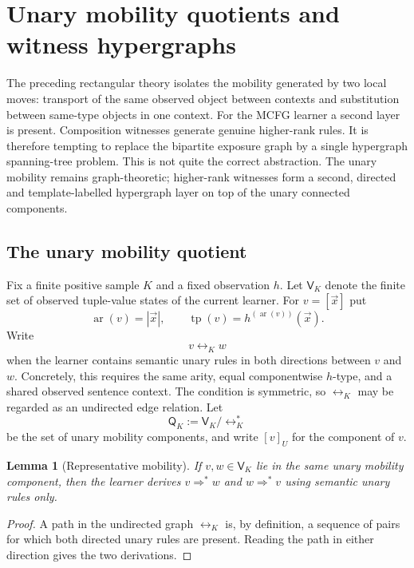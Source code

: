 \documentclass[11pt]{article}
\newtheorem{lemma}[definition]{Lemma}
\begin{document}
\section{Unary mobility quotients and witness hypergraphs}
\label{sec:witness-hypergraph}

The preceding rectangular theory isolates the mobility generated by two local
moves: transport of the same observed object between contexts and substitution
between same-type objects in one context.  For the MCFG learner a second layer
is present.  Composition witnesses generate genuine
higher-rank rules.  It is therefore tempting to replace the bipartite exposure
graph by a single hypergraph spanning-tree problem.  This is not quite the
correct abstraction.  The unary mobility remains graph-theoretic; higher-rank
witnesses form a second, directed and template-labelled hypergraph layer on top
of the unary connected components.

\subsection{The unary mobility quotient}

Fix a finite positive sample $K$ and a fixed observation $h$.  Let
$\mathsf V_K$ denote the finite set of observed tuple-value states of the
current learner.  For $v=[\vec x]$ put
\[
  \operatorname{ar}(v)=|\vec x|,
  \qquad
  \operatorname{tp}(v)=h^{(\operatorname{ar}(v))}(\vec x).
\]
Write
\[
  v\leftrightarrow_K w
\]
when the learner contains semantic unary rules in both directions between
$v$ and $w$.  Concretely, this requires the same arity, equal componentwise $h$-type,
and a shared observed sentence context.  The
condition is symmetric, so $\leftrightarrow_K$ may be regarded as an undirected
edge relation.  Let
\[
  \mathsf Q_K:=\mathsf V_K/{\leftrightarrow_K^*}
\]
be the set of unary mobility components, and write $[v]_U$ for the component
of $v$.

\begin{lemma}[Representative mobility]
\label{lem:representative-mobility}
If $v,w\in\mathsf V_K$ lie in the same unary mobility component, then the
learner derives $v\Rightarrow^* w$ and $w\Rightarrow^* v$ using semantic unary
rules only.
\end{lemma}
\begin{proof}
A path in the undirected graph $\leftrightarrow_K$ is, by definition, a
sequence of pairs for which both directed unary rules are present.  Reading the
path in either direction gives the two derivations.
\end{proof}
\end{document}
